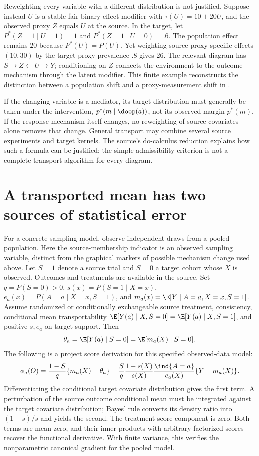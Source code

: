 Reweighting every variable with a different distribution is not
justified. Suppose instead $U$ is a stable fair binary effect modifier
with $\tau(U)=10+20U$, and the observed proxy $Z$ equals $U$ at the
source. In the target, let $P^*(Z=1\mid U=1)=1$ and
$P^*(Z=1\mid U=0)=.6$. The population effect remains $20$ because
$P^*(U)=P(U)$. Yet weighting source proxy-specific effects $(10,30)$
by the target proxy prevalence $.8$ gives $26$. The relevant diagram
has $S\to Z\leftarrow U\to Y$; conditioning on $Z$ connects the
environment to the outcome mechanism through the latent modifier.
This finite example reconstructs the distinction between a population
shift and a proxy-measurement shift in
\citet[Section 3, Examples 1--2]{pearltransport2014}.

If the changing variable is a mediator, its target distribution must
generally be taken under the intervention, $p^*(m\mid\doop(a))$,
not its observed margin $p^*(m)$. If the response mechanism itself
changes, no reweighting of source covariates alone removes that change.
General transport may combine several source experiments and target
kernels. The source's do-calculus reduction explains how such a
formula can be justified; the simple admissibility criterion is not
a complete transport algorithm for every diagram.

\section{A transported mean has two sources of statistical error}
\label{r3:transport-gradient}
For a concrete sampling model, observe independent draws from a pooled
population. Here the source-membership indicator is an observed sampling
variable, distinct from the graphical markers of possible mechanism change
used above. Let $S=1$ denote a source trial and $S=0$ a target cohort
whose $X$ is observed. Outcomes and treatments are available in the
source. Set $q=P(S=0)>0$, $s(x)=P(S=1\mid X=x)$,
$e_a(x)=P(A=a\mid X=x,S=1)$, and
$m_a(x)=\E[Y\mid A=a,X=x,S=1]$. Assume randomized or conditionally
exchangeable source treatment, consistency, conditional mean
transportability $\E[Y(a)\mid X,S=0]=\E[Y(a)\mid X,S=1]$,
and positive $s,e_a$ on target support. Then
\[
 \theta_a=\E[Y(a)\mid S=0]=\E[m_a(X)\mid S=0].
\]
The following is a project score derivation for this specified
observed-data model:
\begin{equation}
 \phi_a(O)=\frac{1-S}{q}\{m_a(X)-\theta_a\}
 +\frac{S}{q}\frac{1-s(X)}{s(X)}
          \frac{\ind\{A=a\}}{e_a(X)}\{Y-m_a(X)\}.
 \label{r3:transport-if}
\end{equation}
Differentiating the conditional target covariate distribution gives
the first term. A perturbation of the source outcome conditional
mean must be integrated against the target covariate distribution;
Bayes' rule converts its density ratio into $(1-s)/s$ and yields
the second. The treatment-score component is zero. Both terms are
mean zero, and their inner products with arbitrary factorized scores
recover the functional derivative. With finite variance, this
verifies the nonparametric canonical gradient for the pooled model.

